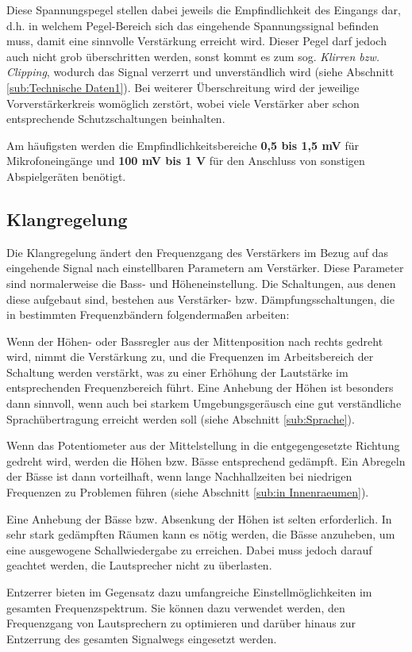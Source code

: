 Diese Spannungspegel stellen dabei jeweils die Empfindlichkeit des Eingangs dar, d.h. in welchem Pegel-Bereich sich das eingehende Spannungssignal befinden muss, damit eine sinnvolle Verstärkung erreicht wird. Dieser Pegel darf jedoch auch nicht grob überschritten werden, sonst kommt es zum sog. \textit{Klirren bzw. Clipping}, wodurch das Signal verzerrt und unverständlich wird (siehe Abschnitt \ref{sub:Technische Daten1}). Bei weiterer Überschreitung wird der jeweilige Vorverstärkerkreis womöglich zerstört, wobei viele Verstärker aber schon entsprechende Schutzschaltungen beinhalten.

Am häufigsten werden die Empfindlichkeitsbereiche \textbf{0,5 bis 1,5 mV} für Mikrofoneingänge und \textbf{100 mV bis 1 V} für den Anschluss von sonstigen Abspielgeräten benötigt.

\subsection{Klangregelung}
\label{sub:Klangregelung}
Die Klangregelung ändert den Frequenzgang des Verstärkers im Bezug auf das eingehende Signal nach einstellbaren Parametern am Verstärker. Diese Parameter sind normalerweise die Bass- und Höheneinstellung. Die Schaltungen, aus denen diese aufgebaut sind, bestehen aus Verstärker- bzw. Dämpfungsschaltungen, die in bestimmten Frequenzbändern folgendermaßen arbeiten:
\begin{compactenum}
\item  Wenn der Höhen- oder Bassregler aus der Mittenposition nach rechts gedreht wird, nimmt die Verstärkung zu, und die Frequenzen im Arbeitsbereich der Schaltung werden verstärkt, was zu einer Erhöhung der Lautstärke im entsprechenden Frequenzbereich führt. Eine Anhebung der Höhen ist besonders dann sinnvoll, wenn auch bei starkem Umgebungsgeräusch eine gut verständliche Sprachübertragung erreicht werden soll (siehe Abschnitt \ref{sub:Sprache}).
\item Wenn das Potentiometer aus der Mittelstellung in die entgegengesetzte Richtung gedreht wird, werden die Höhen bzw. Bässe entsprechend gedämpft. Ein Abregeln der Bässe ist dann vorteilhaft, wenn lange Nachhallzeiten bei niedrigen Frequenzen zu Problemen führen (siehe Abschnitt \ref{sub:in Innenraeumen}).
\item Eine Anhebung der Bässe bzw. Absenkung der Höhen ist selten erforderlich. In sehr stark gedämpften Räumen kann es nötig werden, die Bässe anzuheben, um eine ausgewogene Schallwiedergabe zu erreichen. Dabei muss jedoch darauf geachtet werden, die Lautsprecher nicht zu überlasten.
\end{compactenum}
Entzerrer bieten im Gegensatz dazu umfangreiche Einstellmöglichkeiten im gesamten Frequenzspektrum. Sie können dazu verwendet werden, den Frequenzgang von Lautsprechern zu optimieren und darüber hinaus zur Entzerrung des gesamten Signalwegs eingesetzt werden.

